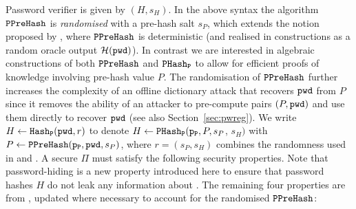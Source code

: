 \noindent
Password verifier \ver is given by $(H, s_H)$.
In the above syntax the algorithm $\mathtt{PPreHash}$ is \emph{randomised} with a pre-hash salt $s_P$, which extends the notion proposed by \citet{BenhamoudaP13}, where $\mathtt{PPreHash}$ is deterministic (and realised in constructions as a random oracle output $\mathcal{H}(\mathtt{pwd})$). 
In contrast we are interested in algebraic constructions of both $\mathtt{PPreHash}$ and $\mathtt{PHash_P}$ to allow for efficient proofs of knowledge involving pre-hash value $P$. 
The randomisation of $\mathtt{PPreHash}$ further increases the complexity of an offline dictionary attack that recovers $\mathtt{pwd}$ from $P$ since it removes the ability of an attacker to pre-compute pairs $(P,\mathtt{pwd})$ and use them directly to recover $\mathtt{pwd}$ (see also Section~\ref{sec:pwreg}). 
We write $H\gets \mathtt{Hash_P}(\mathtt{pwd},r)$ to denote $H\gets \mathtt{PHash_P}(\mathtt{p_P},P,s_P$, $s_H)$ with $P\gets\mathtt{PPreHash}(\mathtt{p_P},\mathtt{pwd},s_P)$, where $r=(s_P,s_H)$ combines the randomness used in \PHash and \PPreHash. 
A secure $\Pi$ must satisfy the following security properties. 
Note that password-hiding is a new property introduced here to ensure that password hashes $H$ do not leak any information about \pwd. 
The remaining four properties are from \cite{BenhamoudaP13}, updated where necessary to account for the randomised $\mathtt{PPreHash}$:

